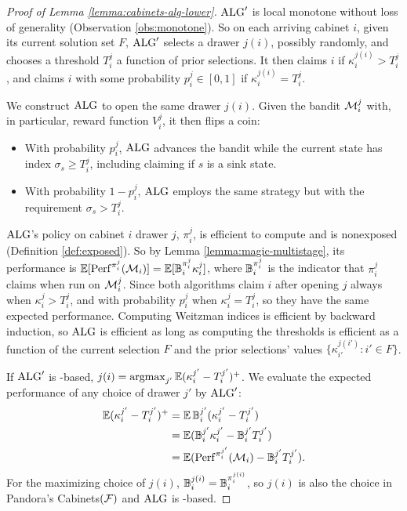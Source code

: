 \begin{proof}[Proof of Lemma \ref{lemma:cabinets-alg-lower}]
	$\mathrm{ALG}'$ is local monotone without loss of generality (Observation \ref{obs:monotone}).
	So on each arriving cabinet $i$, given its current solution set $F$, $\mathrm{ALG}'$ selects a drawer $j(i)$, possibly randomly, and chooses a threshold $T_i^j$ a function of prior selections.
	It then claims $i$ if $\kappa_i^{j(i)} > T_i^j$, and claims $i$ with some probability $p_i^j \in [0,1]$ if $\kappa_i^{j(i)} = T_i^j$.
	
	We construct $\mathrm{ALG}$ to open the same drawer $j(i)$.
	Given the bandit $\mathcal{M}_i^j$ with, in particular, reward function $V_i^j$, it then flips a coin:
	\begin{itemize}
		\item With probability $p_i^j$, $\mathrm{ALG}$ advances the bandit while the current state has index $\sigma_s \geq T_i^j$, including claiming if $s$ is a sink state.
		\item With probability $1-p_i^j$, $\mathrm{ALG}$ employs the same strategy but with the requirement $\sigma_s > T_i^j$.
	\end{itemize}
	$\mathrm{ALG}$'s policy on cabinet $i$ drawer $j$, $\pi_i^j$, is efficient to compute and is nonexposed (Definition \ref{def:exposed}).
	So by Lemma \ref{lemma:magic-multistage}, its performance is $\operatorname*{\mathbb{E}}[\mathrm{Perf}^{\pi_i^j}(\mathcal{M}_i)] = \operatorname*{\mathbb{E}}[ \mathbb{B}^{\pi_i^j}_{i}  \kappa_i^j]$, where $\mathbb{B}^{\pi_i^j}_{i}$ is the indicator that $\pi_i^j$ claims when run on $\mathcal{M}_i^j$.
	Since both algorithms claim $i$ after opening $j$ always when $\kappa_i^j > T_i^j$, and with probability $p_i^j$ when $\kappa_i^j = T_i^j$, so they have the same expected performance.
    Computing Weitzman indices is efficient by backward induction, so $\mathrm{ALG}$ is efficient as long as computing the thresholds is efficient as a function of the current selection $F$ and the prior selections' values $\{\kappa_{i'}^{j(i')} : i' \in F\}$.

	If $\mathrm{ALG}'$ is \SAUP-based, $j(i) = \operatorname*{argmax}_{j'}\operatorname*{\mathbb{E}}(\kappa_i^{j'}-T_i^{j'})^+$.
	We evaluate the expected performance of any choice of drawer $j'$ by $\mathrm{ALG}'$:
	\begin{align*}
		\operatorname*{\mathbb{E}}(\kappa_i^{j'}-T_i^{j'})^+ &=  \operatorname*{\mathbb{E}}\mathbb{B}_i^{j'}(\kappa_i^{j'}-T_i^{j'})\\
		&=  \operatorname*{\mathbb{E}}(\mathbb{B}_i^{j'}\kappa_i^{j'}-\mathbb{B}_i^{j'}T_i^{j'})\\
		&=  \operatorname*{\mathbb{E}}(\mathrm{Perf}^{\pi_i^{j'}}(\mathcal{M}_i)-\mathbb{B}_i^{j'}T_i^{j'}).
	\end{align*}
	For the maximizing choice of $j(i)$, $\mathbb{B}_i^{j(i)} = \mathbb{B}_i^{\pi_i^{j(i)}}$, so $j(i)$ is also the \SAUP{} choice in Pandora's Cabinets$(\mathcal{F})$ and $\mathrm{ALG}$ is \SAUP-based.
\end{proof}


